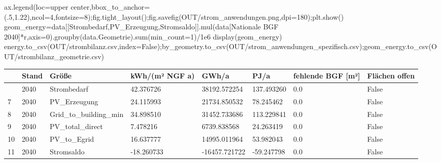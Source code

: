 \documentclass[
  ngerman,
  a4paper,
  DIV=11]{scrreprt}
\newenvironment{Shaded}{\begin{snugshade}}{\end{snugshade}}
\newcommand{\BuiltInTok}[1]{\textcolor[rgb]{0.00,0.23,0.31}{#1}}
\newcommand{\DecValTok}[1]{\textcolor[rgb]{0.68,0.00,0.00}{#1}}
\newcommand{\FloatTok}[1]{\textcolor[rgb]{0.68,0.00,0.00}{#1}}
\newcommand{\NormalTok}[1]{\textcolor[rgb]{0.00,0.23,0.31}{#1}}
\newcommand{\OperatorTok}[1]{\textcolor[rgb]{0.37,0.37,0.37}{#1}}
\newcommand{\StringTok}[1]{\textcolor[rgb]{0.13,0.47,0.30}{#1}}
\newcommand{\VariableTok}[1]{\textcolor[rgb]{0.07,0.07,0.07}{#1}}
\newcounter{none} %
\begin{document}
\begin{Shaded}
\begin{Highlighting}[]
\NormalTok{ax.legend(loc}\OperatorTok{=}\StringTok{\textquotesingle{}upper center\textquotesingle{}}\NormalTok{,bbox\_to\_anchor}\OperatorTok{=}\NormalTok{(}\FloatTok{.5}\NormalTok{,}\FloatTok{1.22}\NormalTok{),ncol}\OperatorTok{=}\DecValTok{4}\NormalTok{,fontsize}\OperatorTok{=}\DecValTok{8}\NormalTok{)}\OperatorTok{;}\NormalTok{fig.tight\_layout()}\OperatorTok{;}\NormalTok{fig.savefig(OUT}\OperatorTok{/}\StringTok{\textquotesingle{}strom\_anwendungen.png\textquotesingle{}}\NormalTok{,dpi}\OperatorTok{=}\DecValTok{180}\NormalTok{)}\OperatorTok{;}\NormalTok{plt.show()}
\NormalTok{geom\_energy}\OperatorTok{=}\NormalTok{data[[}\StringTok{\textquotesingle{}Strombedarf\textquotesingle{}}\NormalTok{,}\StringTok{\textquotesingle{}PV\_Erzeugung\textquotesingle{}}\NormalTok{,}\StringTok{\textquotesingle{}Stromsaldo\textquotesingle{}}\NormalTok{]].mul(data[}\StringTok{\textquotesingle{}Nationale BGF 2040\textquotesingle{}}\NormalTok{]}\OperatorTok{*}\NormalTok{r,axis}\OperatorTok{=}\DecValTok{0}\NormalTok{).groupby(data.Geometrie).}\BuiltInTok{sum}\NormalTok{(min\_count}\OperatorTok{=}\DecValTok{1}\NormalTok{)}\OperatorTok{/}\FloatTok{1e6}
\NormalTok{display(geom\_energy)}
\NormalTok{energy.to\_csv(OUT}\OperatorTok{/}\StringTok{\textquotesingle{}strombilanz.csv\textquotesingle{}}\NormalTok{,index}\OperatorTok{=}\VariableTok{False}\NormalTok{)}\OperatorTok{;}\NormalTok{by\_geometry.to\_csv(OUT}\OperatorTok{/}\StringTok{\textquotesingle{}strom\_anwendungen\_spezifisch.csv\textquotesingle{}}\NormalTok{)}\OperatorTok{;}\NormalTok{geom\_energy.to\_csv(OUT}\OperatorTok{/}\StringTok{\textquotesingle{}strombilanz\_geometrie.csv\textquotesingle{}}\NormalTok{)}
\end{Highlighting}
\end{Shaded}

{\def\LTcaptype{none} %
\begin{longtable}[]{@{}llllllll@{}}
\toprule\noalign{}
& Stand & Größe & kWh/(m² NGF a) & GWh/a & PJ/a & fehlende BGF {[}m²{]}
& Flächen offen \\
\midrule\noalign{}
\endhead
\bottomrule\noalign{}
\endlastfoot
6 & 2040 & Strombedarf & 42.376726 & 38192.572254 & 137.493260 & 0.0 &
False \\
7 & 2040 & PV\_Erzeugung & 24.115993 & 21734.850532 & 78.245462 & 0.0 &
False \\
8 & 2040 & Grid\_to\_building\_min & 34.898510 & 31452.733686 &
113.229841 & 0.0 & False \\
9 & 2040 & PV\_total\_direct & 7.478216 & 6739.838568 & 24.263419 & 0.0
& False \\
10 & 2040 & PV\_to\_Egrid & 16.637777 & 14995.011964 & 53.982043 & 0.0 &
False \\
11 & 2040 & Stromsaldo & -18.260733 & -16457.721722 & -59.247798 & 0.0 &
False \\
\end{longtable}
}
\end{document}
